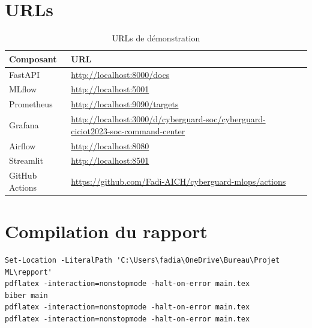 \section{URLs}
\begin{table}[H]
\centering
\caption{URLs de démonstration}
\label{tab:urls}
\begin{tabularx}{\linewidth}{@{}lY@{}}
\toprule
\textbf{Composant} & \textbf{URL}\\
\midrule
FastAPI & \url{http://localhost:8000/docs}\\
MLflow & \url{http://localhost:5001}\\
Prometheus & \url{http://localhost:9090/targets}\\
Grafana & \url{http://localhost:3000/d/cyberguard-soc/cyberguard-ciciot2023-soc-command-center}\\
Airflow & \url{http://localhost:8080}\\
Streamlit & \url{http://localhost:8501}\\
GitHub Actions & \url{https://github.com/Fadi-AICH/cyberguard-mlops/actions}\\
\bottomrule
\end{tabularx}
\end{table}

\section{Compilation du rapport}
\begin{lstlisting}
Set-Location -LiteralPath 'C:\Users\fadia\OneDrive\Bureau\Projet ML\repport'
pdflatex -interaction=nonstopmode -halt-on-error main.tex
biber main
pdflatex -interaction=nonstopmode -halt-on-error main.tex
pdflatex -interaction=nonstopmode -halt-on-error main.tex
\end{lstlisting}
